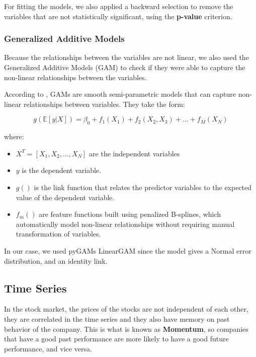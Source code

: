 \documentclass[11pt,english,a4paper,hidelinks]{book}
\begin{document}
\noindent For fitting the models, we also applied a backward selection to remove the variables that are not statistically significant, using the \textbf{p-value} criterion.

\subsubsection{Generalized Additive Models}

Because the relationships between the variables are not linear, we also used the Generalized Additive Models (GAM) to check if they were able to capture the non-linear relationships between the variables.

\vspace{0.5cm}
\noindent According to \textcite{pygam2018}, GAMs are smooth semi-parametric models that can capture non-linear relationships between variables. They take the form:

\begin{equation}
    g(\mathbb{E}[y|X]) = \beta_0 + f_1(X_1) + f_2(X_2,X_3) + \dots + f_M(X_N)
\end{equation}

\noindent where:
\begin{itemize}
    \item \(X^T = [X_1, X_2, \dots, X_N]\) are the independent variables
    \item \(y\) is the dependent variable.
    \item \(g()\) is the link function that relates the predictor variables to the expected value of the dependent variable.
    \item \(f_m()\) are feature functions built using penalized B-splines, which automatically model non-linear relationships without requiring manual transformation of variables.
\end{itemize}

\noindent In our case, we used pyGAMs LinearGAM since the model gives a Normal error distribution, and an identity link.

\subsection{Time Series}
In the stock market, the prices of the stocks are not independent of each other, they are correlated in the time series and they also have memory on past behavior of the company. This is what is known as \textbf{Momentum}, so companies that have a good past performance are more likely to have a good future performance, and vice versa.
\end{document}
